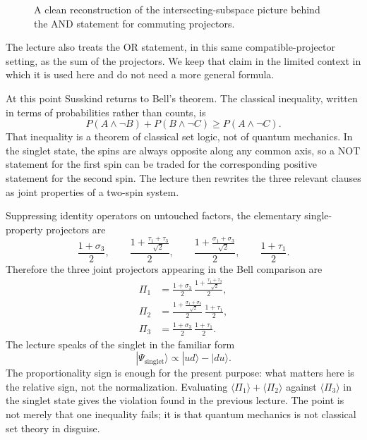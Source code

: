 \begin{figure}[htbp]
\centering
{}
\caption{A clean reconstruction of the intersecting-subspace picture behind the AND statement for commuting projectors.}
\end{figure}

\begin{remark}
The lecture also treats the OR statement, in this same compatible-projector setting, as the sum of the projectors. We keep that claim in the limited context in which it is used here and do not need a more general formula.
\end{remark}

At this point Susskind returns to Bell's theorem. The classical inequality, written in terms of probabilities rather than counts, is
\begin{equation}
P(A\wedge \neg B)+P(B\wedge \neg C)\ge P(A\wedge \neg C).
\end{equation}
That inequality is a theorem of classical set logic, not of quantum mechanics. In the singlet state, the spins are always opposite along any common axis, so a NOT statement for the first spin can be traded for the corresponding positive statement for the second spin. The lecture then rewrites the three relevant clauses as joint properties of a two-spin system.

Suppressing identity operators on untouched factors, the elementary single-property projectors are
\begin{equation}
\frac{1+\sigma_3}{2},\qquad
\frac{1+\frac{\tau_1+\tau_3}{\sqrt2}}{2},\qquad
\frac{1+\frac{\sigma_1+\sigma_3}{\sqrt2}}{2},\qquad
\frac{1+\tau_1}{2}.
\end{equation}
Therefore the three joint projectors appearing in the Bell comparison are
\begin{align}
\Pi_1 &= \frac{1+\sigma_3}{2}\,\frac{1+\frac{\tau_1+\tau_3}{\sqrt2}}{2}, \\
\Pi_2 &= \frac{1+\frac{\sigma_1+\sigma_3}{\sqrt2}}{2}\,\frac{1+\tau_1}{2}, \\
\Pi_3 &= \frac{1+\sigma_3}{2}\,\frac{1+\tau_1}{2}.
\end{align}
The lecture speaks of the singlet in the familiar form
\begin{equation}
|\Psi_{\mathrm{singlet}}\rangle \propto |ud\rangle-|du\rangle.
\end{equation}
The proportionality sign is enough for the present purpose: what matters here is the relative sign, not the normalization. Evaluating \(\langle \Pi_1\rangle+\langle \Pi_2\rangle\) against \(\langle \Pi_3\rangle\) in the singlet state gives the violation found in the previous lecture. The point is not merely that one inequality fails; it is that quantum mechanics is not classical set theory in disguise.


